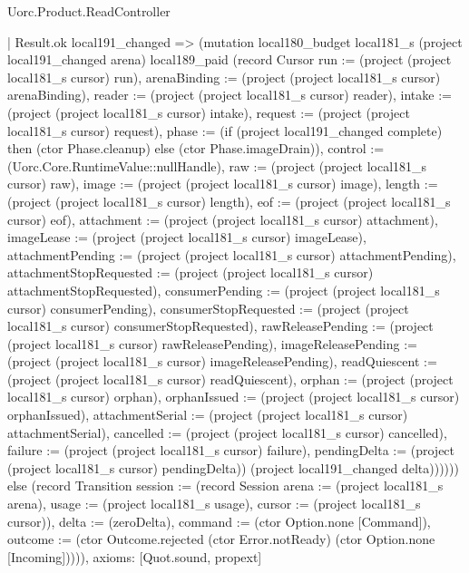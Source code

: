 \begin{lexlean}{Uorc.Product.ReadController}
\begin{semanticmodule}
{        | Result.ok local191_changed => (mutation local180_budget local181_s (project local191_changed arena) local189_paid (record Cursor {run := (project (project local181_s cursor) run), arenaBinding := (project (project local181_s cursor) arenaBinding), reader := (project (project local181_s cursor) reader), intake := (project (project local181_s cursor) intake), request := (project (project local181_s cursor) request), phase := (if (project local191_changed complete) then (ctor Phase.cleanup) else (ctor Phase.imageDrain)), control := (Uorc.Core.RuntimeValue::nullHandle), raw := (project (project local181_s cursor) raw), image := (project (project local181_s cursor) image), length := (project (project local181_s cursor) length), eof := (project (project local181_s cursor) eof), attachment := (project (project local181_s cursor) attachment), imageLease := (project (project local181_s cursor) imageLease), attachmentPending := (project (project local181_s cursor) attachmentPending), attachmentStopRequested := (project (project local181_s cursor) attachmentStopRequested), consumerPending := (project (project local181_s cursor) consumerPending), consumerStopRequested := (project (project local181_s cursor) consumerStopRequested), rawReleasePending := (project (project local181_s cursor) rawReleasePending), imageReleasePending := (project (project local181_s cursor) imageReleasePending), readQuiescent := (project (project local181_s cursor) readQuiescent), orphan := (project (project local181_s cursor) orphan), orphanIssued := (project (project local181_s cursor) orphanIssued), attachmentSerial := (project (project local181_s cursor) attachmentSerial), cancelled := (project (project local181_s cursor) cancelled), failure := (project (project local181_s cursor) failure), pendingDelta := (project (project local181_s cursor) pendingDelta)}) (project local191_changed delta)))))) else (record Transition {session := (record Session {arena := (project local181_s arena), usage := (project local181_s usage), cursor := (project local181_s cursor)}), delta := (zeroDelta), command := (ctor Option.none [Command]), outcome := (ctor Outcome.rejected (ctor Error.notReady) (ctor Option.none [Incoming]))})),
  axioms: [Quot.sound, propext]
}


\end{semanticmodule}
\end{lexlean}
